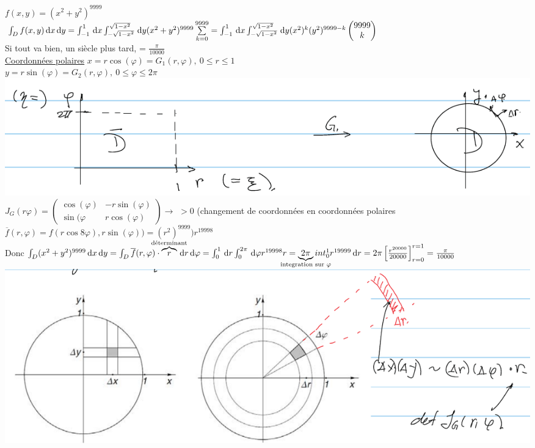 \documentclass[12pt,a4paper]{article}
\begin{document}
$f(x,y) = (x^2+y^2)^{9999}$\\
$\int_D f(x,y) \deriv{x}\deriv{y} = \int_{-1}^1 \deriv{x} \int_{-\sqrt{1-x^2}}^{\sqrt{1-x^2}} \deriv{y} (x^2+y^2)^{9999}\somme{9999}{k=0} = \int_{-1}^1 \deriv{x} \int_{-\sqrt{1-x^2}}^{\sqrt{1-x^2}} \deriv{y} (x^2)^k(y^2)^{9999-k}\combi{9999}{k}$\\
Si tout va bien, un siècle plus tard, = $\frac{\pi}{10000}$\\
\uline{Coordonnées polaires}
$x = r\cos(\varphi) = G_1(r,\varphi),\ 0 \leq r \leq 1$\\
$y = r\sin(\varphi) = G_2(r,\varphi),\ 0\leq \varphi\leq 2\pi$\\
\includegraphics[scale=0.5]{images/integ_disque}\\
$J_G(r\varphi) = \begin{pmatrix}
\cos(\varphi) & -r\sin(\varphi)\\
\sin(\varphi & r\cos(\varphi)
\end{pmatrix} \to$ $ > 0$ (changement de coordonnées en coordonnées polaires\\
$\overline{f}(r,\varphi) = f(r\cos8\varphi),r\sin(\varphi)) = (r^2)^{9999} ) r^{19998}$\\
Donc $\int_D (x^2+y^2)^{9999}\deriv{x}\deriv{y} =\int_D \overline{f}(r,\varphi) \cdot \overbrace{r}^{\mathclap{\text{déterminant}}} \deriv{r}\deriv{\varphi} = \int_0^1 \deriv{r} \int_0^{2\pi} \deriv{\varphi} r^{19998}r = \underbrace{2\pi}_{\mathclap{\text{integration sur } \varphi}} int_0^1 r^{19999} \deriv{r} = 2\pi\left[ \frac{r^{20000}}{20000}\right]_{r=0}^{r=1} = \frac{\pi}{10000}$\\
\includegraphics[scale=0.5]{images/explication_deltas}\\
\\
\end{document}
